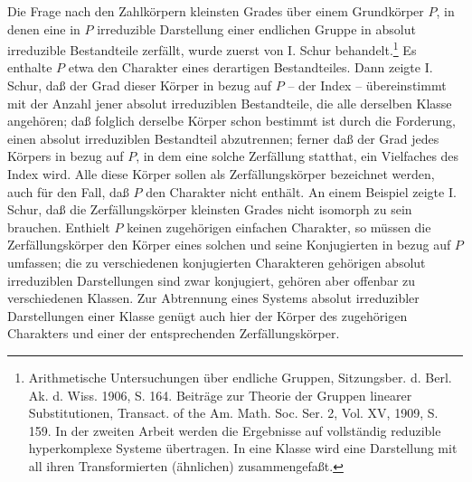 Die Frage nach den Zahlkörpern kleinsten Grades über einem Grundkörper $P$, in denen eine in $P$ irreduzible Darstellung einer endlichen Gruppe in absolut irreduzible Bestandteile zerfällt, wurde zuerst von I. Schur behandelt.\footnote{Arithmetische Untersuchungen über endliche Gruppen, Sitzungsber. d. Berl. Ak. d. Wiss. 1906, S. 164. Beiträge zur Theorie der Gruppen linearer Substitutionen, Transact. of the Am. Math. Soc. Ser. 2, Vol. XV, 1909, S. 159. In der zweiten Arbeit werden die Ergebnisse auf vollständig reduzible hyperkomplexe Systeme übertragen. In eine Klasse wird eine Darstellung mit all ihren Transformierten (ähnlichen) zusammengefaßt.} Es enthalte $P$ etwa den Charakter eines derartigen Bestandteiles. Dann zeigte I. Schur, daß der Grad dieser Körper in bezug auf $P$ -- der Index -- übereinstimmt mit der Anzahl jener absolut irreduziblen Bestandteile, die alle derselben Klasse angehören; daß folglich derselbe Körper schon bestimmt ist durch die Forderung, einen absolut irreduziblen Bestandteil abzutrennen; ferner daß der Grad jedes Körpers in bezug auf $P$, in dem eine solche Zerfällung statthat, ein Vielfaches des Index wird. Alle diese Körper sollen als Zerfällungskörper bezeichnet werden, auch für den Fall, daß $P$ den Charakter nicht enthält. An einem Beispiel zeigte I. Schur, daß die Zerfällungskörper kleinsten Grades nicht isomorph zu sein brauchen. Enthielt $P$ keinen zugehörigen einfachen Charakter, so müssen die Zerfällungskörper den Körper eines solchen und seine Konjugierten in bezug auf $P$ umfassen; die zu verschiedenen konjugierten Charakteren gehörigen absolut irreduziblen Darstellungen sind zwar konjugiert, gehören aber offenbar zu verschiedenen Klassen. Zur Abtrennung eines Systems absolut irreduzibler Darstellungen einer Klasse genügt auch hier der Körper des zugehörigen Charakters und einer der entsprechenden Zerfällungskörper.
